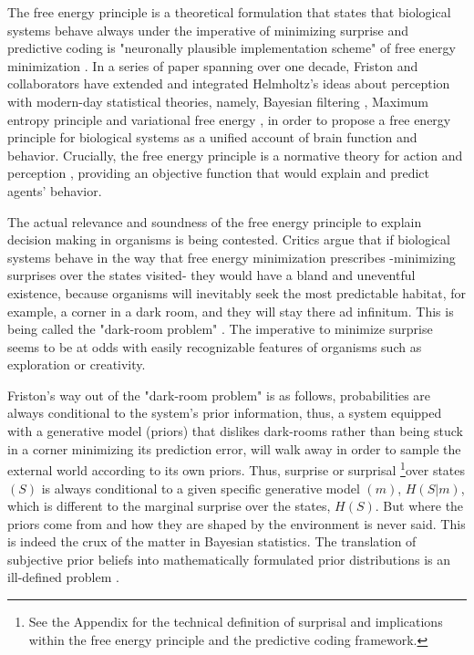 \documentclass[11pt, onecolumn]{article}
\begin{document}
The free energy principle is a theoretical formulation that states that biological systems behave always under the imperative of minimizing surprise and predictive coding is "neuronally plausible implementation scheme" of free energy minimization \citep{schwartenbeck_exploration_2013}. In a series of paper spanning over one decade, Friston and collaborators have extended and integrated Helmholtz’s ideas about perception with modern-day statistical theories, namely, Bayesian filtering \citep{friston_theory_2005}, Maximum entropy principle \citep{Jaynes:2003} and variational free energy \citep{Hinton-Camp:1993}, in order to propose a free energy principle for biological systems as a unified account of brain function and behavior.
Crucially, the free energy principle is a normative theory for action and perception \citep{schwartenbeck_exploration_2013}, providing an objective function that would explain and predict agents' behavior. 

The actual relevance and soundness of the free energy principle to explain decision making in organisms is being contested. Critics argue that if biological systems behave in the way that free energy minimization prescribes -minimizing surprises over the states visited- they would have a bland and uneventful existence, because organisms will inevitably seek the most predictable habitat, for example, a corner in a dark room, and they will stay there ad infinitum. This is being called the "dark-room problem" \citep{friston_free-energy_2012}. The imperative to minimize surprise seems to be at odds with easily recognizable features of organisms such as exploration or creativity.

Friston's way out of the "dark-room problem" is as follows, probabilities are always conditional to the system's prior information, thus, a system equipped with a generative model (priors) that dislikes dark-rooms rather than being stuck in a corner minimizing its prediction error, will walk away in order to sample the external world according to its own priors. Thus, surprise or surprisal  \footnote{See the Appendix for the technical definition of surprisal and implications within the free energy principle and the predictive coding framework.}over states $(S)$ is always conditional to a given specific generative model $(m)$, $H(S|m)$, which is different to the marginal surprise over the states, $H(S)$.
But where the priors come from and how they are shaped by the environment is never said. This is indeed the crux of the matter in Bayesian statistics. The translation of subjective prior beliefs into mathematically formulated prior distributions is an ill-defined problem \citep{Gomez-ramirez_limitations_2013}. 
\end{document}
